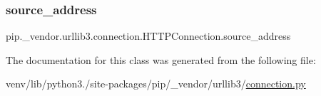 \subsubsection{\texorpdfstring{source\+\_\+address}{source\_address}}
{\footnotesize\ttfamily pip.\+\_\+vendor.\+urllib3.\+connection.\+H\+T\+T\+P\+Connection.\+source\+\_\+address}



The documentation for this class was generated from the following file\+:\begin{DoxyCompactItemize}
\item 
venv/lib/python3./site-\/packages/pip/\+\_\+vendor/urllib3/\hyperlink{connection_8py}{connection.\+py}\end{DoxyCompactItemize}
